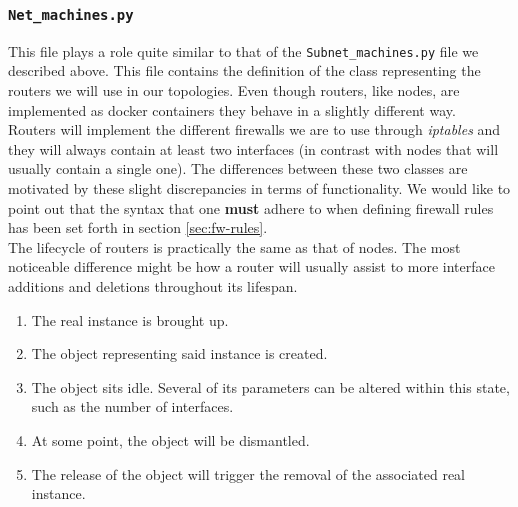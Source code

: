 \subsubsection{\texttt{Net\_machines.py}}
    This file plays a role quite similar to that of the \texttt{Subnet\_machines.py} file we described above. This file contains the definition of the class representing the routers we will use in our topologies. Even though routers, like nodes, are implemented as docker containers they behave in a slightly different way.\\

    Routers will implement the different firewalls we are to use through \textit{iptables} and they will always contain at least two interfaces (in contrast with nodes that will usually contain a single one). The differences between these two classes are motivated by these slight discrepancies in terms of functionality. We would like to point out that the syntax that one \textbf{must} adhere to when defining firewall rules has been set forth in section \ref{sec:fw-rules}.\\

    The lifecycle of routers is practically the same as that of nodes. The most noticeable difference might be how a router will usually assist to more interface additions and deletions throughout its lifespan.\\

    \begin{enumerate}
        \item The real instance is brought up.
        \item The object representing said instance is created.
        \item The object sits idle. Several of its parameters can be altered within this state, such as the number of interfaces.
        \item At some point, the object will be dismantled.
        \item The release of the object will trigger the removal of the associated real instance.
    \end{enumerate}

